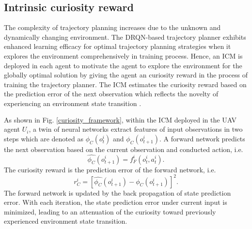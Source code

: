 \documentclass[conference]{IEEEtran}
\begin{document}
\subsection{Intrinsic curiosity reward}
The complexity of trajectory planning increases due to the unknown and dynamically changing environment. The DRQN-based trajectory planner exhibits enhanced learning efficacy for optimal trajectory planning strategies when it explores the environment comprehensively in training process. Hence, an ICM is deployed in each agent to motivate the agent to explore the environment for the globally optimal solution by giving the agent an curiosity reward in the process of training the trajectory planner. The ICM estimates the curiosity reward based on the prediction error of the next observation which reflects the novelty of experiencing an environment state transition \cite{FHuang22}. 

As shown in Fig. \ref{curiosity_framework}, within the ICM deployed in the UAV agent $U_i$, a twin of neural networks extract features of input observations in two steps which are denoted as $\phi_{C}\left(o^{i}_{t}\right)$ and $\phi_{C}\left(o^{i}_{t+1}\right)$. A forward network predicts the next observation based on the current observation and conducted action, i.e.
\begin{equation}\label{icm_fwd}
  \hat{\phi_{C}}\left({o^{i}_{t+1}}\right)=f^{i}_{F}\left({o^{i}_{t}, a^{i}_{t}}\right).
\end{equation}
The curiosity reward is the prediction error of the forward network, i.e. 
\begin{equation}\label{icm_output}
  r^{i}_{C}=\left[{\hat{\phi_{C}}\left({o^{i}_{t+1}}\right)-\phi_{C}\left({o^{i}_{t+1}}\right)}\right]^{2}.
\end{equation}
The forward network is updated by the back propagation of state prediction error. With each iteration, the state prediction error under current input is minimized, leading to an attenuation of the curiosity toward previously experienced environment state transition. 
\end{document}
